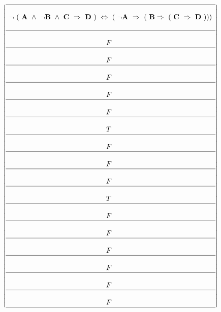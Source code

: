 \documentclass[10pt]{article}
\begin{document}
\[ 
\left | 
\begin{array}{l}
 \hline  \\
 \bf \neg \ ( \ A \ \wedge \ \neg B \ \wedge \  C \ \Rightarrow \ D \ )
\ \Leftrightarrow \ (\ \neg A \ \Rightarrow \ ( \ B \Rightarrow \ ( \ C \ \Rightarrow \ D \ )))
\\  \\ 
\hline \\
\hspace{48mm}F \\
\hline \\
\hspace{48mm}F \\
\hline \\
\hspace{48mm}F \\
\hline \\
\hspace{48mm}F \\
\hline \\
\hspace{48mm}F \\
\hline \\
\hspace{48mm}T \\
\hline \\
\hspace{48mm}F \\
\hline \\
\hspace{48mm}F \\
\hline \\
\hspace{48mm}F \\
\hline \\
\hspace{48mm}T \\
\hline \\
\hspace{48mm}F \\
\hline \\
\hspace{48mm}F \\
\hline \\
\hspace{48mm}F \\
\hline \\
\hspace{48mm}F \\
\hline \\
\hspace{48mm}F \\
\hline \\
\hspace{48mm}F \\
\hline
\end{array} 
\right | \] 
\\ \\
% 
\end{document}
